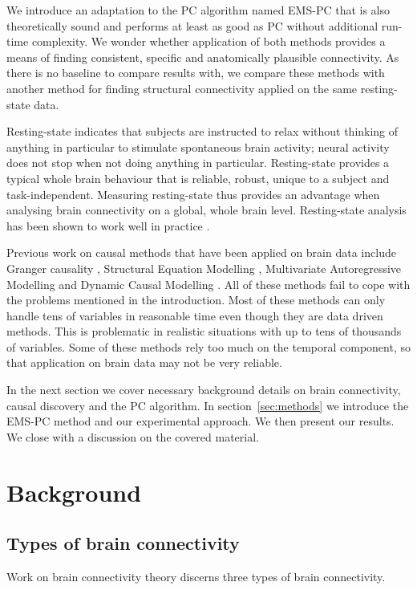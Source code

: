 \documentclass[a4paper, 10pt, english, onecolumn]{article}
\begin{document}
We introduce an adaptation to the PC algorithm named EMS-PC that is also theoretically sound and performs at least as good as PC without additional run-time complexity.
We wonder whether application of both methods provides a means of finding consistent, specific and anatomically plausible connectivity.
As there is no baseline to compare results with, we compare these methods with another method for finding structural connectivity applied on the same resting-state data.

Resting-state indicates that subjects are instructed to relax without thinking of anything in particular to stimulate spontaneous brain activity; neural activity does not stop when not doing anything in particular.
Resting-state provides a typical whole brain behaviour that is reliable, robust, unique to a subject and task-independent.
Measuring resting-state thus provides an advantage when analysing brain connectivity on a global, whole brain level.
Resting-state analysis has been shown to work well in practice \cite{Lowe2000, doria2010, Bullmore2009}.

Previous work on causal methods that have been applied on brain data include Granger causality \cite{roebroeck2005}, Structural Equation Modelling \cite{mclntosh1994}, Multivariate Autoregressive Modelling \cite{harrison2003} and Dynamic Causal Modelling \cite{friston2003}.
All of these methods fail to cope with the problems mentioned in the introduction.
Most of these methods can only handle tens of variables in reasonable time even though they are data driven methods.
This is problematic in realistic situations with up to tens of thousands of variables.
Some of these methods rely too much on the temporal component, so that application on brain data may not be very reliable.

In the next section we cover necessary background details on brain connectivity, causal discovery and the PC algorithm.
In section~\ref{sec:methods} we introduce the EMS-PC method and our experimental approach.
We then present our results.
We close with a discussion on the covered material.

\section{Background}
\subsection{Types of brain connectivity}
Work on brain connectivity theory discerns three types of brain connectivity.
\end{document}
